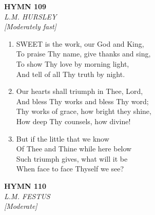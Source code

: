 \documentclass[11pt,a4paper]{article}
\begin{document}
\newpage
\begin{center}
    {\Large \textbf{HYMN 109}}
    \\
    \textit{L.M. HURSLEY}
    \\
    \textit{\small [Moderately fast]}
\end{center}
\vspace{1em}

\begin{enumerate}
    \item SWEET is the work, our God and King, \\
        To praise Thy name, give thanks and sing, \\
        To show Thy love by morning light, \\
        And tell of all Thy truth by night.

    \item Our hearts shall triumph in Thee, Lord, \\
        And bless Thy works and bless Thy word; \\
        Thy works of grace, how bright they shine, \\
        How deep Thy counsels, how divine!

    \item But if the little that we know \\
        Of Thee and Thine while here below \\
        Such triumph gives, what will it be \\
        When face to face Thyself we see?

\end{enumerate}

\newpage
\begin{center}
    {\Large \textbf{HYMN 110}}
    \\
    \textit{L.M. FESTUS}
    \\
    \textit{\small [Moderate]}
\end{center}
\vspace{1em}
\end{document}
